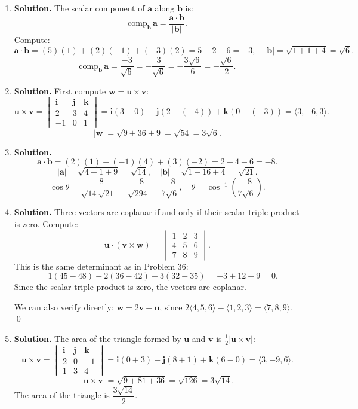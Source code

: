 \begin{enumerate}
\item \textbf{Solution.}
The scalar component of \( \mathbf{a} \) along \( \mathbf{b} \) is:
\[
\text{comp}_{\mathbf{b}}\,\mathbf{a} = \frac{\mathbf{a} \cdot \mathbf{b}}{|\mathbf{b}|}.
\]
Compute:
\[
\mathbf{a} \cdot \mathbf{b} = (5)(1) + (2)(-1) + (-3)(2) = 5 - 2 - 6 = -3, \quad |\mathbf{b}| = \sqrt{1 + 1 + 4} = \sqrt{6}.
\]
\[
\text{comp}_{\mathbf{b}}\,\mathbf{a} = \frac{-3}{\sqrt{6}} = -\frac{3}{\sqrt{6}} = -\frac{3\sqrt{6}}{6} = -\frac{\sqrt{6}}{2}.
\]

\item \textbf{Solution.}
First compute \( \mathbf{w} = \mathbf{u} \times \mathbf{v} \):
\[
\mathbf{u} \times \mathbf{v} = \begin{vmatrix} \mathbf{i} & \mathbf{j} & \mathbf{k} \\ 2 & 3 & 4 \\ -1 & 0 & 1 \end{vmatrix} = \mathbf{i}(3 - 0) - \mathbf{j}(2 - (-4)) + \mathbf{k}(0 - (-3)) = \langle 3, -6, 3 \rangle.
\]
\[
|\mathbf{w}| = \sqrt{9 + 36 + 9} = \sqrt{54} = 3\sqrt{6}.
\]

\item \textbf{Solution.}
\[
\mathbf{a} \cdot \mathbf{b} = (2)(1) + (-1)(4) + (3)(-2) = 2 - 4 - 6 = -8.
\]
\[
|\mathbf{a}| = \sqrt{4 + 1 + 9} = \sqrt{14}, \quad |\mathbf{b}| = \sqrt{1 + 16 + 4} = \sqrt{21}.
\]
\[
\cos\theta = \frac{-8}{\sqrt{14}\sqrt{21}} = \frac{-8}{\sqrt{294}} = \frac{-8}{7\sqrt{6}}, \quad \theta = \cos^{-1}\!\left(\frac{-8}{7\sqrt{6}}\right).
\]

\item \textbf{Solution.}
Three vectors are coplanar if and only if their scalar triple product is zero. Compute:
\[
\mathbf{u} \cdot (\mathbf{v} \times \mathbf{w}) = \begin{vmatrix} 1 & 2 & 3 \\ 4 & 5 & 6 \\ 7 & 8 & 9 \end{vmatrix}.
\]
This is the same determinant as in Problem 36:
\[
= 1(45 - 48) - 2(36 - 42) + 3(32 - 35) = -3 + 12 - 9 = 0.
\]
Since the scalar triple product is zero, the vectors are coplanar.

We can also verify directly: \( \mathbf{w} = 2\mathbf{v} - \mathbf{u} \), since \( 2\langle 4,5,6\rangle - \langle 1,2,3\rangle = \langle 7,8,9\rangle \). \qed

\item \textbf{Solution.}
The area of the triangle formed by \( \mathbf{u} \) and \( \mathbf{v} \) is \( \frac{1}{2}|\mathbf{u} \times \mathbf{v}| \):
\[
\mathbf{u} \times \mathbf{v} = \begin{vmatrix} \mathbf{i} & \mathbf{j} & \mathbf{k} \\ 2 & 0 & -1 \\ 1 & 3 & 4 \end{vmatrix} = \mathbf{i}(0 + 3) - \mathbf{j}(8 + 1) + \mathbf{k}(6 - 0) = \langle 3, -9, 6 \rangle.
\]
\[
|\mathbf{u} \times \mathbf{v}| = \sqrt{9 + 81 + 36} = \sqrt{126} = 3\sqrt{14}.
\]
The area of the triangle is \( \dfrac{3\sqrt{14}}{2} \).


\end{enumerate}
